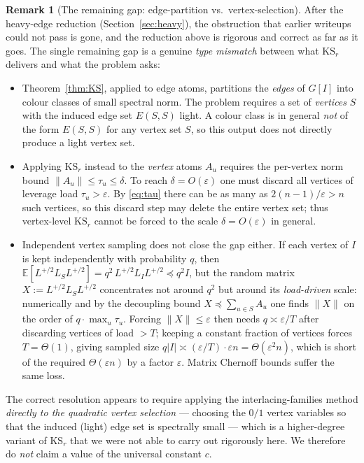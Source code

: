 \documentclass[12pt]{article}
\theoremstyle{definition}
\newtheorem{remark}{Remark}
\newcommand{\E}{\mathbb{E}}
\newcommand{\eps}{\varepsilon}
\begin{document}
\begin{remark}[The remaining gap: edge-partition vs.\ vertex-selection]\label{rem:gap}
After the heavy-edge reduction (Section~\ref{sec:heavy}), the obstruction that earlier writeups could
not pass is gone, and the reduction above is rigorous and correct as far as it goes. The single
remaining gap is a genuine \emph{type mismatch} between what $\mathrm{KS}_r$ delivers and what the
problem asks:

\begin{itemize}
\item Theorem~\ref{thm:KS}, applied to edge atoms, partitions the \emph{edges} of $G[I]$ into colour
classes of small spectral norm. The problem requires a set of \emph{vertices} $S$ with the induced
edge set $E(S,S)$ light. A colour class is in general \emph{not} of the form $E(S,S)$ for any vertex
set $S$, so this output does not directly produce a light vertex set.

\item Applying $\mathrm{KS}_r$ instead to the \emph{vertex} atoms $A_u$ requires the per-vertex norm
bound $\|A_u\|\le\tau_u\le\delta$. To reach $\delta=O(\eps)$ one must discard all vertices of leverage
load $\tau_u>\eps$. By \eqref{eq:tau} there can be as many as $2(n-1)/\eps>n$ such vertices, so this
discard step may delete the entire vertex set; thus vertex-level $\mathrm{KS}_r$ cannot be forced to
the scale $\delta=O(\eps)$ in general.

\item Independent vertex sampling does not close the gap either. If each vertex of $I$ is kept
independently with probability $q$, then $\E[L^{+/2}L_SL^{+/2}]=q^2\,L^{+/2}L_IL^{+/2}\preceq q^2 I$,
but the random matrix $X:=L^{+/2}L_SL^{+/2}$ concentrates not around $q^2$ but around its
\emph{load-driven} scale: numerically and by the decoupling bound $X\preceq\sum_{u\in S}A_u$ one finds
$\|X\|$ on the order of $q\cdot\max_u\tau_u$. Forcing $\|X\|\le\eps$ then needs $q\asymp\eps/T$ after
discarding vertices of load $>T$; keeping a constant fraction of vertices forces $T=\Theta(1)$, giving
sampled size $q|I|\asymp(\eps/T)\cdot\eps n=\Theta(\eps^2 n)$, which is short of the required
$\Theta(\eps n)$ by a factor $\eps$. Matrix Chernoff bounds suffer the same loss.
\end{itemize}

The correct resolution appears to require applying the interlacing-families method \emph{directly to
the quadratic vertex selection} --- choosing the $0/1$ vertex variables so that the induced (light)
edge set is spectrally small --- which is a higher-degree variant of $\mathrm{KS}_r$ that we were not
able to carry out rigorously here. We therefore do \emph{not} claim a value of the universal constant
$c$.
\end{remark}
\end{document}
